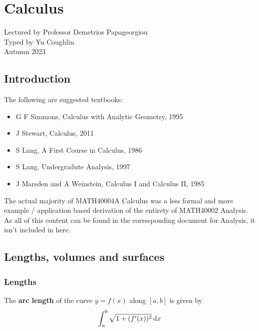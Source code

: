 \documentclass[../Year1/Year1.tex]{subfiles}
\begin{document}
\chapter{Calculus}
\renewcommand*\thesection{\arabic{section}}
Lectured by Professor Demetrios Papageorgiou \\ Typed by Yu Coughlin \\
Autumn 2023

\section*{Introduction}


The following are suggested textbooks:
\begin{itemize}
    \item G F Simmons, Calculus with Analytic Geometry, 1995
    \item J Stewart, Calculus, 2011
    \item S Lang, A First Course in Calculus, 1986
    \item S Lang, Undergradute Analysis, 1997
    \item J Marsden and A Weinstein, Calculus I and Calculus II, 1985
\end{itemize}
\begin{note*}
    The actual majority of MATH40004A Calculus was a less formal and more example / application based derivation of the entirety of MATH40002 Analysis. 
    As all of this content can be found in the corresponding document for Analysis, it isn't included in here.
\end{note*}

\tableofcontents\pagebreak

\section{Lengths, volumes and surfaces}

\subsection{Lengths}

\begin{theorem}
    The \textbf{arc length} of the curve $y=f(x)$ along $[a,b]$ is given by \[
        \intd{a}{b}{\sqrt{1+(f'(x))^2}}{x}
    \]
\end{theorem}
\end{document}
